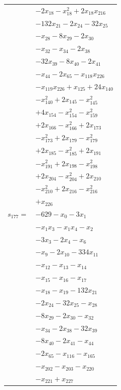 \begin{longtable}{@{}r@{\;}l@{}}
 & \(\displaystyle -2x_{18} -x_{18}^{2} +2x_{18}x_{216}\) \\
 & \(\displaystyle -132x_{21} -2x_{24} -32x_{25}\) \\
 & \(\displaystyle -x_{28} -8x_{29} -2x_{30}\) \\
 & \(\displaystyle -x_{32} -x_{34} -2x_{38}\) \\
 & \(\displaystyle -32x_{39} -8x_{40} -2x_{41}\) \\
 & \(\displaystyle -x_{44} -2x_{65} -x_{118}x_{226}\) \\
 & \(\displaystyle -x_{119}x_{226} +x_{125} +24x_{140}\) \\
 & \(\displaystyle -x_{140}^{2} +2x_{145} -x_{145}^{2}\) \\
 & \(\displaystyle +4x_{154} -x_{154}^{2} -x_{159}^{2}\) \\
 & \(\displaystyle +2x_{166} -x_{166}^{2} +2x_{173}\) \\
 & \(\displaystyle -x_{173}^{2} +2x_{179} -x_{179}^{2}\) \\
 & \(\displaystyle +2x_{185} -x_{185}^{2} +2x_{191}\) \\
 & \(\displaystyle -x_{191}^{2} +2x_{198} -x_{198}^{2}\) \\
 & \(\displaystyle +2x_{204} -x_{204}^{2} +2x_{210}\) \\
 & \(\displaystyle -x_{210}^{2} +2x_{216} -x_{216}^{2}\) \\
 & \(\displaystyle +x_{226}\) \\[3pt]
\(s_{177}=\) & \(\displaystyle -629 -x_{0} -3x_{1}\) \\
 & \(\displaystyle -x_{1}x_{3} -x_{1}x_{4} -x_{2}\) \\
 & \(\displaystyle -3x_{3} -2x_{4} -x_{6}\) \\
 & \(\displaystyle -x_{9} -2x_{10} -334x_{11}\) \\
 & \(\displaystyle -x_{12} -x_{13} -x_{14}\) \\
 & \(\displaystyle -x_{15} -x_{16} -x_{17}\) \\
 & \(\displaystyle -x_{18} -x_{19} -132x_{21}\) \\
 & \(\displaystyle -2x_{24} -32x_{25} -x_{28}\) \\
 & \(\displaystyle -8x_{29} -2x_{30} -x_{32}\) \\
 & \(\displaystyle -x_{34} -2x_{38} -32x_{39}\) \\
 & \(\displaystyle -8x_{40} -2x_{41} -x_{44}\) \\
 & \(\displaystyle -2x_{65} -x_{116} -x_{165}\) \\
 & \(\displaystyle -x_{202} -x_{203} -x_{220}\) \\
 & \(\displaystyle -x_{221} +x_{227}\) \\[3pt]
\end{longtable}
\endgroup
